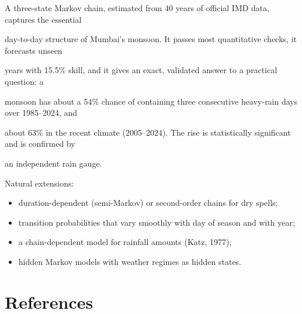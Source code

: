 \documentclass[11pt,a4paper]{article}
\providecommand{\tightlist}{\setlength{\itemsep}{0pt}\setlength{\parskip}{0pt}}
\begin{document}
A three-state Markov chain, estimated from 40 years of official IMD data, captures the essential

day-to-day structure of Mumbai's monsoon. It passes most quantitative checks, it forecasts unseen

years with 15.5\% skill, and it gives an exact, validated answer to a practical question: a

monsoon has about a 54\% chance of containing three consecutive heavy-rain days over 1985--2024, and

about 63\% in the recent climate (2005--2024). The rise is statistically significant and is confirmed by

an independent rain gauge.



Natural extensions:



\begin{itemize}

\tightlist

\item

  duration-dependent (semi-Markov) or second-order chains for dry spells;

\item

  transition probabilities that vary smoothly with day of season and with year;

\item

  a chain-dependent model for rainfall amounts (Katz, 1977);

\item

  hidden Markov models with weather regimes as hidden states.

\end{itemize}



\section*{References}\label{references}
\end{document}

